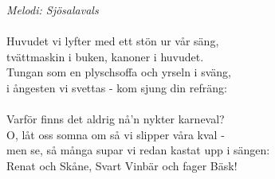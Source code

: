 {\footnotesize\textit{Melodi: Sjösalavals}}\\
\\
Huvudet vi lyfter med ett stön ur vår säng,\\
tvättmaskin i buken, kanoner i huvudet.\\
Tungan som en plyschsoffa och yrseln i sväng,\\
i ångesten vi svettas - kom sjung din refräng:\\
\\
Varför finns det aldrig nå'n nykter karneval?\\
O, låt oss somna om så vi slipper våra kval -\\
men se, så många supar vi redan kastat upp i sängen:\\
Renat och Skåne, Svart Vinbär och fager Bäsk!
